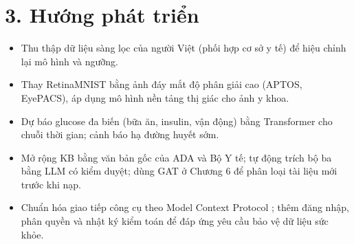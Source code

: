 \section*{3. Hướng phát triển}

\begin{itemize}
  \item Thu thập dữ liệu sàng lọc của người Việt (phối hợp cơ sở y tế) để hiệu chỉnh lại mô hình và ngưỡng.
  \item Thay RetinaMNIST bằng ảnh đáy mắt độ phân giải cao (APTOS, EyePACS), áp dụng mô hình nền tảng thị giác cho ảnh y khoa.
  \item Dự báo glucose đa biến (bữa ăn, insulin, vận động) bằng Transformer cho chuỗi thời gian; cảnh báo hạ đường huyết sớm.
  \item Mở rộng KB bằng văn bản gốc của ADA và Bộ Y tế; tự động trích bộ ba bằng LLM có kiểm duyệt; dùng GAT ở Chương 6 để phân loại tài liệu mới trước khi nạp.
  \item Chuẩn hóa giao tiếp công cụ theo Model Context Protocol \cite{mcp2024}; thêm đăng nhập, phân quyền và nhật ký kiểm toán để đáp ứng yêu cầu bảo vệ dữ liệu sức khỏe.
\end{itemize}
